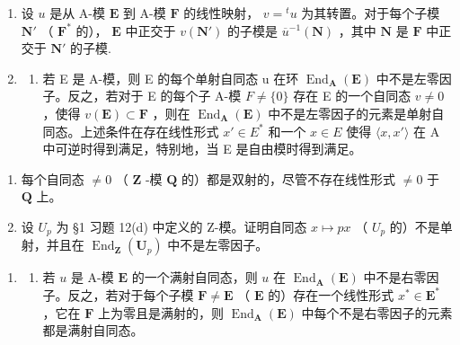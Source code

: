 \begin{enumerate}
\def\labelenumi{\arabic{enumi}.}
\setcounter{enumi}{4}
\item
  设 \(u\) 是从 A-模 \(\mathbf{E}\) 到 A-模 \(\mathbf{F}\) 的线性映射， \(v = {}^t u\) 为其转置。对于每个子模 \(\mathbf{N}'\) （ \(\mathbf{F}^*\) 的）， \(\mathbf{E}\) 中正交于 \(v(\mathbf{N}')\) 的子模是 \(\overline{u}^{-1}(\mathbf{N})\) ，其中 \(\mathbf{N}\) 是 \(\mathbf{F}\) 中正交于 \(\mathbf{N}'\) 的子模.
\item
  \begin{enumerate}
  \def\labelenumii{(\alph{enumii})}
  \tightlist
  \item
    若 E 是 A-模，则 E 的每个单射自同态 u 在环 \(\operatorname{End}_{\mathbf{A}}(\mathbf{E})\) 中不是左零因子。反之，若对于 E 的每个子 A-模 \(F \neq \{0\}\) 存在 E 的一个自同态 \(v \neq 0\) ，使得 \(v(\mathbf{E}) \subset \mathbf{F}\) ，则在 \(\operatorname{End}_{\mathbf{A}}(\mathbf{E})\) 中不是左零因子的元素是单射自同态。上述条件在存在线性形式 \(x' \in E^*\) 和一个 \(x \in E\) 使得 \(\langle x, x' \rangle\) 在 A 中可逆时得到满足，特别地，当 E 是自由模时得到满足。
  \end{enumerate}
\end{enumerate}

\begin{enumerate}
\def\labelenumi{(\alph{enumi})}
\setcounter{enumi}{1}
\item
  每个自同态 \(\neq 0\) （ \(\mathbf{Z}\) -模 \(\mathbf{Q}\) 的）都是双射的，尽管不存在线性形式 \(\neq 0\) 于 \(\mathbf{Q}\) 上。
\item
  设 \(U_{p}\) 为 §1 习题 12(d) 中定义的 Z-模。证明自同态 \(x \mapsto px\) （ \(U_{p}\) 的）不是单射，并且在 \(\operatorname{End}_{\mathbf{Z}}(\mathbf{U}_{p})\) 中不是左零因子。
\end{enumerate}

\begin{enumerate}
\def\labelenumi{\arabic{enumi}.}
\setcounter{enumi}{6}
\tightlist
\item
  \begin{enumerate}
  \def\labelenumii{(\alph{enumii})}
  \tightlist
  \item
    若 \(u\) 是 A-模 \(\mathbf{E}\) 的一个满射自同态，则 \(u\) 在 \(\operatorname{End}_{\mathbf{A}}(\mathbf{E})\) 中不是右零因子。反之，若对于每个子模 \(\mathbf{F} \neq \mathbf{E}\) （ \(\mathbf{E}\) 的）存在一个线性形式 \(x^{*} \in \mathbf{E}^{*}\) ，它在 \(\mathbf{F}\) 上为零且是满射的，则 \(\operatorname{End}_{\mathbf{A}}(\mathbf{E})\) 中每个不是右零因子的元素都是满射自同态。
  \end{enumerate}
\end{enumerate}

